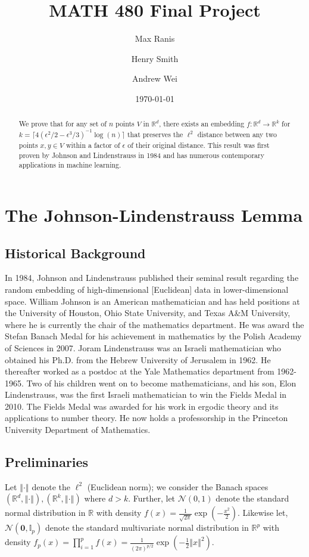 \documentclass{article}
\title{MATH 480 Final Project}
\author[]{Max Ranis}
\author[]{Henry Smith}
\author[]{Andrew Wei}
\affil[]{\normalsize Yale University}
\date{\today}
\begin{document}
\maketitle

\begin{abstract}
    \noindent We prove that for any set of $n$ points $V$ in $\mathbb{R}^d$, there exists an embedding $f: \mathbb{R}^d \rightarrow \mathbb{R}^k$ for $k = \lceil 4(\epsilon^2/2 - \epsilon^3/3)^{-1} \log(n) \rceil$ that preserves the $\ell^2$ distance between any two points $x, y \in V$ within a factor of $\epsilon$ of their original distance. This result was first proven by Johnson and Lindenstrauss in 1984 and has numerous contemporary applications in machine learning.
\end{abstract}


\pagebreak

\section{The Johnson-Lindenstrauss Lemma}

\subsection{Historical Background}
In 1984, Johnson and Lindenstrauss published their seminal result regarding the random embedding of high-dimensional [Euclidean] data in lower-dimensional space. William Johnson is an American mathematician and has held positions at the University of Houston, Ohio State University, and Texas A\&M University, where he is currently the chair of the mathematics department. He was award the Stefan Banach Medal for his achievement in mathematics by the Polish Academy of Sciences in 2007. Joram Lindenstrauss was an Israeli mathematician who obtained his Ph.D. from the Hebrew University of Jerusalem in 1962. He thereafter worked as a postdoc at the Yale Mathematics department from 1962-1965. Two of his children went on to become mathematicians, and his son, Elon Lindenstrauss, was the first Israeli mathematician to win the Fields Medal in 2010. The Fields Medal was awarded for his work in ergodic theory and its applications to number theory. He now holds a professorship in the Princeton University Department of Mathematics.

\subsection{Preliminaries}
Let $\left\Vert \cdot \right\Vert$ denote the $\ell^2$ (Euclidean norm); we consider the Banach spaces $(\mathbb{R}^d, \left\Vert \cdot \right\Vert), (\mathbb{R}^k, \left\Vert \cdot \right\Vert)$ where $d > k$. Further, let $\mathcal{N}(0, 1)$ denote the standard normal distribution in $\mathbb{R}$ with density $f(x) = \frac{1}{\sqrt{2 \pi}} \exp \left(-\frac{x^2}{2} \right)$. Likewise let, $\mathcal{N}(\boldsymbol{0}, \mathbb{I}_p)$ denote the standard multivariate normal distribution in $\mathbb{R}^p$ with density $f_p(x) = \prod_{i=1}^p f(x) = \frac{1}{(2 \pi)^{p/2}} \exp \left(-\frac{1}{2} \left\Vert x \right\Vert^2 \right)$.
\end{document}
